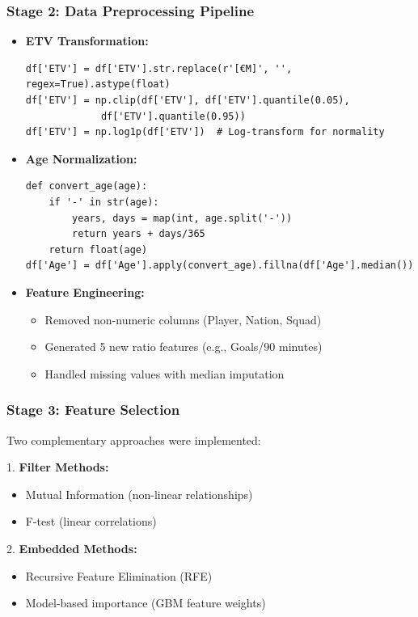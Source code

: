 \documentclass[12pt,a4paper]{article}
\begin{document}
\subsubsection{Stage 2: Data Preprocessing Pipeline}
\begin{itemize}
    \item \textbf{ETV Transformation:}
    \begin{verbatim}
df['ETV'] = df['ETV'].str.replace(r'[€M]', '', regex=True).astype(float)
df['ETV'] = np.clip(df['ETV'], df['ETV'].quantile(0.05), 
             df['ETV'].quantile(0.95))
df['ETV'] = np.log1p(df['ETV'])  # Log-transform for normality
    \end{verbatim}
    
    \item \textbf{Age Normalization:}
    \begin{verbatim}
def convert_age(age):
    if '-' in str(age):
        years, days = map(int, age.split('-'))
        return years + days/365
    return float(age)
df['Age'] = df['Age'].apply(convert_age).fillna(df['Age'].median())
    \end{verbatim}
    
    \item \textbf{Feature Engineering:}
    \begin{itemize}
        \item Removed non-numeric columns (Player, Nation, Squad)
        \item Generated 5 new ratio features (e.g., Goals/90 minutes)
        \item Handled missing values with median imputation
    \end{itemize}
\end{itemize}

\subsubsection{Stage 3: Feature Selection}
Two complementary approaches were implemented:

1. \textbf{Filter Methods:}
\begin{itemize}
    \item Mutual Information (non-linear relationships)
    \item F-test (linear correlations)
\end{itemize}

2. \textbf{Embedded Methods:}
\begin{itemize}
    \item Recursive Feature Elimination (RFE)
    \item Model-based importance (GBM feature weights)
\end{itemize}
\end{document}
